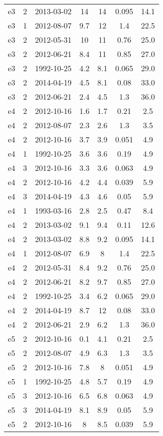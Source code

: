 \begin{table*}[htp]
\begin{tabular}{ccccccc}
e3 & 2 & 2013-03-02 & 14 & 14 & 0.095 & 14.1 \\
e3 & 1 & 2012-08-07 & 9.7 & 12 & 1.4 & 22.5 \\
e3 & 2 & 2012-05-31 & 10 & 11 & 0.76 & 25.0 \\
e3 & 2 & 2012-06-21 & 8.4 & 11 & 0.85 & 27.0 \\
e3 & 2 & 1992-10-25 & 4.2 & 8.1 & 0.065 & 29.0 \\
e3 & 2 & 2014-04-19 & 4.5 & 8.1 & 0.08 & 33.0 \\
e3 & 2 & 2012-06-21 & 2.4 & 4.5 & 1.3 & 36.0 \\
e4 & 2 & 2012-10-16 & 1.6 & 1.7 & 0.21 & 2.5 \\
e4 & 2 & 2012-08-07 & 2.3 & 2.6 & 1.3 & 3.5 \\
e4 & 2 & 2012-10-16 & 3.7 & 3.9 & 0.051 & 4.9 \\
e4 & 1 & 1992-10-25 & 3.6 & 3.6 & 0.19 & 4.9 \\
e4 & 3 & 2012-10-16 & 3.3 & 3.6 & 0.063 & 4.9 \\
e4 & 2 & 2012-10-16 & 4.2 & 4.4 & 0.039 & 5.9 \\
e4 & 3 & 2014-04-19 & 4.3 & 4.6 & 0.05 & 5.9 \\
e4 & 1 & 1993-03-16 & 2.8 & 2.5 & 0.47 & 8.4 \\
e4 & 2 & 2013-03-02 & 9.1 & 9.4 & 0.11 & 12.6 \\
e4 & 2 & 2013-03-02 & 8.8 & 9.2 & 0.095 & 14.1 \\
e4 & 1 & 2012-08-07 & 6.9 & 8 & 1.4 & 22.5 \\
e4 & 2 & 2012-05-31 & 8.4 & 9.2 & 0.76 & 25.0 \\
e4 & 2 & 2012-06-21 & 8.2 & 9.7 & 0.85 & 27.0 \\
e4 & 2 & 1992-10-25 & 3.4 & 6.2 & 0.065 & 29.0 \\
e4 & 2 & 2014-04-19 & 8.7 & 12 & 0.08 & 33.0 \\
e4 & 2 & 2012-06-21 & 2.9 & 6.2 & 1.3 & 36.0 \\
e5 & 2 & 2012-10-16 & 0.1 & 4.1 & 0.21 & 2.5 \\
e5 & 2 & 2012-08-07 & 4.9 & 6.3 & 1.3 & 3.5 \\
e5 & 2 & 2012-10-16 & 7.8 & 8 & 0.051 & 4.9 \\
e5 & 1 & 1992-10-25 & 4.8 & 5.7 & 0.19 & 4.9 \\
e5 & 3 & 2012-10-16 & 6.5 & 6.8 & 0.063 & 4.9 \\
e5 & 3 & 2014-04-19 & 8.1 & 8.9 & 0.05 & 5.9 \\
e5 & 2 & 2012-10-16 & 8 & 8.5 & 0.039 & 5.9 \\

\end{tabular}
\end{table*}
